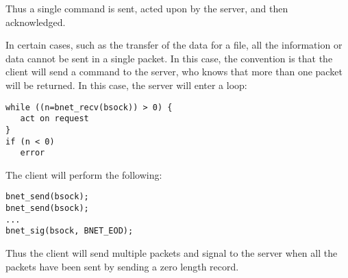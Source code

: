 Thus a single command is sent, acted upon by the server, and then
acknowledged.

In certain cases, such as the transfer of the data for a file, all the
information or data cannot be sent in a single packet. In this case, the
convention is that the client will send a command to the server, who knows
that more than one packet will be returned. In this case, the server will
enter a loop:

\footnotesize
\begin{verbatim}
while ((n=bnet_recv(bsock)) > 0) {
   act on request
}
if (n < 0)
   error
\end{verbatim}
\normalsize

The client will perform the following:

\footnotesize
\begin{verbatim}
bnet_send(bsock);
bnet_send(bsock);
...
bnet_sig(bsock, BNET_EOD);
\end{verbatim}
\normalsize

Thus the client will send multiple packets and signal to the server when all
the packets have been sent by sending a zero length record.

